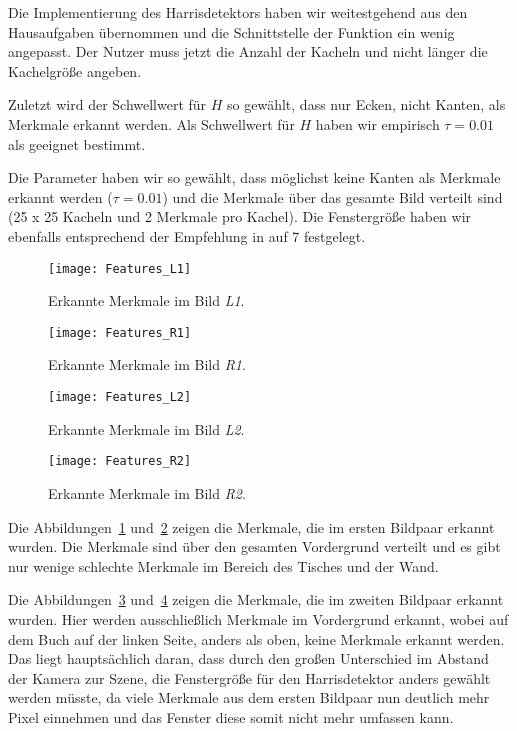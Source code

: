 Die Implementierung des Harrisdetektors haben wir weitestgehend aus den Hausaufgaben übernommen und die Schnittstelle der Funktion ein wenig angepasst. Der Nutzer muss jetzt die Anzahl der Kacheln und nicht länger die Kachelgröße angeben.

Zuletzt wird der Schwellwert für $H$ so gewählt, dass nur Ecken, nicht Kanten, als Merkmale erkannt werden. Als Schwellwert für $H$ haben wir empirisch $\tau = 0.01$ als geeignet bestimmt.

Die Parameter haben wir so gewählt, dass möglichst keine Kanten als Merkmale erkannt werden ($\tau = 0.01$) und die Merkmale über das gesamte Bild verteilt sind (25 x 25 Kacheln und 2 Merkmale pro Kachel). Die Fenstergröße haben wir ebenfalls entsprechend der Empfehlung in \cite[S. 378]{Ma} auf 7 festgelegt.

\begin{figure}[!hp]
	\centering
	\texttt{[image: Features\_L1]}
	\caption{Erkannte Merkmale im Bild \textit{L1}.}
	\label{fig:features_l1}
\end{figure}

\begin{figure}[!hp]
	\centering
	\texttt{[image: Features\_R1]}
	\caption{Erkannte Merkmale im Bild \textit{R1}.}
	\label{fig:features_r1}
\end{figure}

\begin{figure}[!hp]
	\centering
	\texttt{[image: Features\_L2]}
	\caption{Erkannte Merkmale im Bild \textit{L2}.}
	\label{fig:features_l2}
\end{figure}

\begin{figure}[!hp]
	\centering
	\texttt{[image: Features\_R2]}
	\caption{Erkannte Merkmale im Bild \textit{R2}.}
	\label{fig:features_r2}
\end{figure}

Die Abbildungen~\ref{fig:features_l1} und~\ref{fig:features_r1} zeigen die Merkmale, die im ersten Bildpaar erkannt wurden. Die Merkmale sind über den gesamten Vordergrund verteilt und es gibt nur wenige schlechte Merkmale im Bereich des Tisches und der Wand.

Die Abbildungen~\ref{fig:features_l2} und~\ref{fig:features_r2} zeigen die Merkmale, die im zweiten Bildpaar erkannt wurden. Hier werden ausschließlich Merkmale im Vordergrund erkannt, wobei auf dem Buch auf der linken Seite, anders als oben, keine Merkmale erkannt werden. Das liegt hauptsächlich daran, dass durch den großen Unterschied im Abstand der Kamera zur Szene, die Fenstergröße für den Harrisdetektor anders gewählt werden müsste, da viele Merkmale aus dem ersten Bildpaar nun deutlich mehr Pixel einnehmen und das Fenster diese somit nicht mehr umfassen kann.

